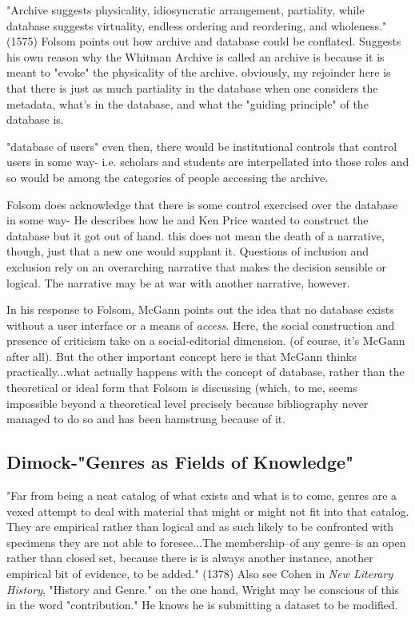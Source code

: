 \documentclass[course, english]{Notes}
\newcommand{\n}{\scalebox{2}{\textbf{\framebox{$\aleph$} } } }
\begin{document}
{\begin{outline}
\1 "Archive suggests physicality, idiosyncratic arrangement, partiality, while database suggests virtuality, endless ordering and reordering, and wholeness." (1575)
	\2 Folsom points out how archive and database could be conflated. Suggests his own reason why the Whitman Archive is called an archive is because it is meant to "evoke" the physicality of the archive.
		\3 \n obviously, my rejoinder here is that there is just as much partiality in the database when one considers the metadata, what's in the database, and what the "guiding principle" of the database is.
		
\1 "database of users"
	\2 even then, there would be institutional controls that control users in some way- i.e. scholars and students are interpellated into those roles and so would be among the categories of people accessing the archive.

\1 Folsom does acknowledge that there is some control exercised over the database in some way- He describes how he and Ken Price wanted to construct the database but it got out of hand. 
	\2 \n this does not mean the death of a narrative, though, just that a new one would supplant it. Questions of inclusion and exclusion rely on an overarching narrative that makes the decision sensible or logical. The narrative may be at war with another narrative, however. 
	
\1 In his response to Folsom, McGann points out the idea that no database exists without a user interface or a means of \textit{access}. Here, the social construction and presence of criticism take on a social-editorial dimension. (of course, it's McGann after all). 
	\2 But the other important concept here is that McGann thinks practically...what actually happens with the concept of database, rather than the theoretical or ideal form that Folsom is discussing (which, to me, seems impossible beyond a theoretical level precisely because bibliography never managed to do so and has been hamstrung because of it.
	
\end{outline}	
	
\subsection{Dimock-"Genres as Fields of Knowledge"}
\begin{outline}
\1 "Far from being a neat catalog of what exists and what is to come, genres are a vexed attempt to deal with material that might or might not fit into that catalog. They are empirical rather than logical and as such likely to be confronted with specimens they are not able to foresee...The membership--of any genre--is an open rather than closed set, because there is is always another instance, another empirical bit of evidence, to be added." (1378)
	\2 Also see Cohen in \textit{New Literary History}, "History and Genre."
	\2 \n on the one hand, Wright may be conscious of this in the word "contribution." He knows he is submitting a dataset to be modified. 
	

\end{outline}}
\end{document}
